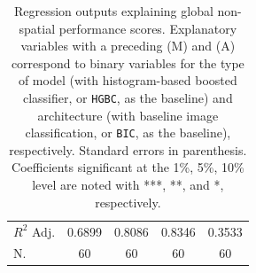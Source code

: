 \begin{table}
\begin{tabular}{lcccc}
$R^2$ Adj.                                        &     0.6899 &           0.8086 &       0.8346 &         0.3533 \\
N.                                                &     60     &           60     &       60     &         60     \\
\bottomrule
\end{tabular}
    \caption{\label{tab:non_sp_reg}\footnotesize Regression outputs explaining
            global non-spatial
    performance scores. Explanatory variables with a preceding (M) and (A)
    correspond to binary variables for the type of model (with histogram-based
            boosted classifier, or \texttt{HGBC}, as the
    baseline) and architecture (with baseline image classification, or
    \texttt{BIC}, as the baseline),
    respectively. Standard errors in parenthesis. Coefficients significant at
    the 1\%, 5\%, 10\% level are noted with ***, **, and *, respectively.}
\end{table}


